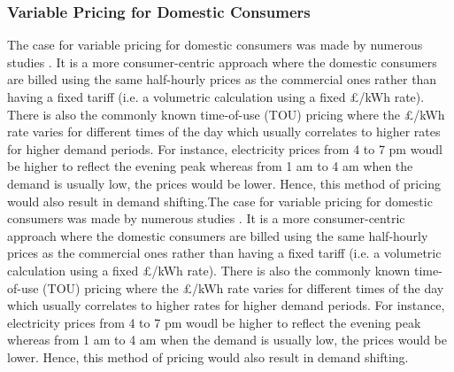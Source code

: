 \documentclass[energies,article,submit,moreauthors,pdftex]{Definitions/mdpi}
\begin{document}



\subsubsection{Variable Pricing for Domestic Consumers}
The case for variable pricing for domestic consumers was made by numerous studies \cite{REF!}. It is a more consumer-centric approach where the domestic consumers are billed using the same half-hourly prices as the commercial ones rather than having a fixed tariff (i.e. a volumetric calculation using a fixed £/kWh rate). There is also the commonly known time-of-use (TOU) pricing where the £/kWh rate varies for different times of the day which usually correlates to higher rates for higher demand periods. For instance, electricity prices from 4 to 7 pm woudl be higher to reflect the evening peak whereas from 1 am to 4 am when the demand is usually low, the prices would be lower. Hence, this method of pricing would also result in demand shifting.The case for variable pricing for domestic consumers was made by numerous studies \cite{REF!}. It is a more consumer-centric approach where the domestic consumers are billed using the same half-hourly prices as the commercial ones rather than having a fixed tariff (i.e. a volumetric calculation using a fixed £/kWh rate). There is also the commonly known time-of-use (TOU) pricing where the £/kWh rate varies for different times of the day which usually correlates to higher rates for higher demand periods. For instance, electricity prices from 4 to 7 pm woudl be higher to reflect the evening peak whereas from 1 am to 4 am when the demand is usually low, the prices would be lower. Hence, this method of pricing would also result in demand shifting.
\end{document}
